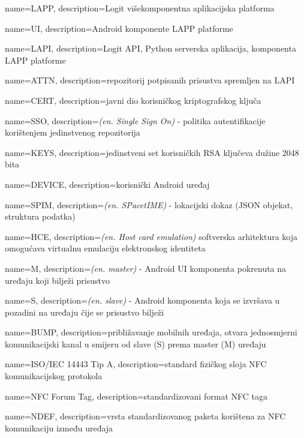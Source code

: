 {name={LAPP}, description={Logit višekomponentna aplikacijska platforma}}

{name={UI}, description={Android komponente LAPP platforme}}

{name={LAPI}, description={Logit API, Python serverska aplikacija, komponenta LAPP platforme}}

{name={ATTN}, description={repozitorij potpisanih prisustva spremljen na LAPI}}

{name={CERT}, description={javni dio korisničkog kriptografskog ključa}}

{name={SSO}, description={\textit{(en. Single Sign On)} - politika autentifikacije korištenjem jedinstvenog repozitorija}}

{name={KEYS}, description={jedinstveni set korisničkih RSA ključeva dužine 2048 bita}}

{name={DEVICE}, description={korisnički Android uređaj}}

{name={SPIM}, description={\textit{(en. SPacetIME)} - lokacijski dokaz (JSON objekat, struktura podatka)}}

{name={HCE}, description={\textit{(en. Host card emulation)} softverska arhitektura koja omogućava virtualnu emulaciju elektronskog identiteta}}

{name={M}, description={\textit{(en. master)} - Android UI komponenta pokrenuta na uređaju koji bilježi prisustvo}}

{name={S}, description={\textit{(en. slave)} - Android komponenta koja se izvršava u pozadini na uređaju čije se prisustvo bilježi}}

{name={BUMP}, description={približavanje mobilnih uređaja, otvara jednosmjerni komunikacijski kanal u smijeru od slave (S) prema master (M) uređaju}}

{name={ISO/IEC 14443 Tip A}, description={standard fizičkog sloja NFC komunikacijskog protokola}}

{name={NFC Forum Tag}, description={standardizovani format NFC taga}}

{name={NDEF}, description={vrsta standardizovanog paketa korištena za NFC komunikaciju između uređaja}}

